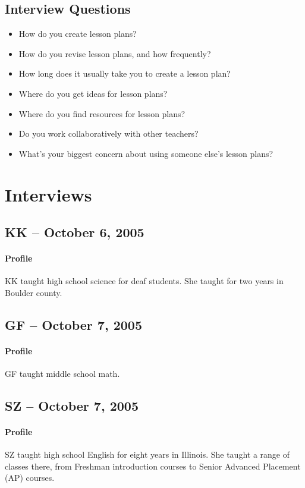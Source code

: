 \documentclass[12pt,titlepage]{article}
\begin{document}
\subsection{Interview Questions}
\begin{itemize}
	\item How do you create lesson plans?
	\item How do you revise lesson plans, and how frequently?
	\item How long does it usually take you to create a lesson plan?
	\item Where do you get ideas for lesson plans?
	\item Where do you find resources for lesson plans?
	\item Do you work collaboratively with other teachers?
	\item What's your biggest concern about using someone else's lesson plans?
\end{itemize}

\section{Interviews}
\subsection{KK -- October 6, 2005}
\paragraph{Profile} KK taught high school science for deaf students. She taught
for two years in Boulder county.

\subsection{GF -- October 7, 2005}
\paragraph{Profile} GF taught middle school math.

\subsection{SZ -- October 7, 2005}
\paragraph{Profile} SZ taught high school English for eight years in Illinois.
She taught a range of classes there, from Freshman introduction courses to
Senior Advanced Placement (AP) courses.
\end{document}
